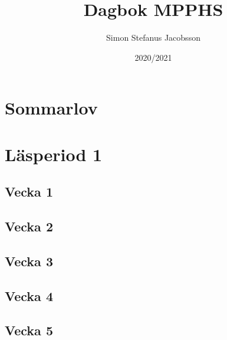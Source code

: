 
\usepackage{textcomp} %



\title{{\Huge {}} Dagbok MPPHS {\Huge {}}}
\author{Simon Stefanus Jacobsson}
\date{2020/2021}


\renewcommand{\thechapter}{\Roman{chapter}}


\maketitle
\tableofcontents

\chapter*{Sommarlov}


\chapter{Läsperiod 1}
\section{Vecka 1}


\section{Vecka 2}


\section{Vecka 3}


\section{Vecka 4}


\section{Vecka 5}



